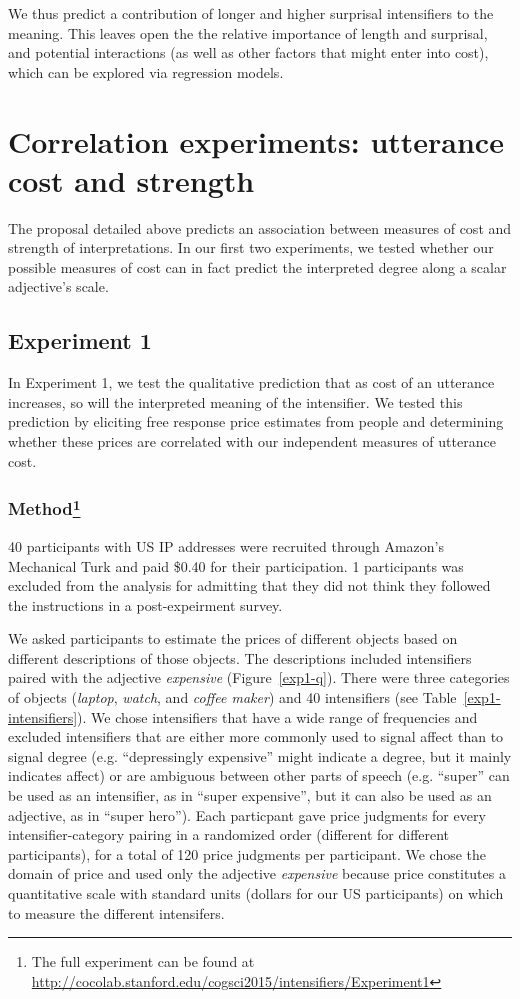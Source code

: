 \documentclass[10pt,letterpaper]{article}
\newcommand{\w}[1]{\emph{#1}}
\begin{document}
We thus predict a contribution of longer and higher surprisal intensifiers to the meaning. 
This leaves open the the relative importance of length and surprisal, and potential interactions (as well as other factors that might enter into cost), which can be explored via regression models.

\section{Correlation experiments: utterance cost and strength}
The proposal detailed above predicts an association between measures of cost and strength of interpretations. In our first two experiments, we tested whether our possible measures of cost can in fact predict the interpreted degree along a scalar adjective's scale.

\subsection{Experiment 1}

In Experiment 1, we test the qualitative prediction that as cost of an utterance increases, so will the interpreted meaning of the intensifier.
We tested this prediction
by eliciting free response price estimates from people and determining whether these prices are correlated with our independent measures of utterance cost.

\subsubsection{Method\footnote{The full experiment can be found at \url{http://cocolab.stanford.edu/cogsci2015/intensifiers/Experiment1}}}

40 participants with US IP addresses were recruited through Amazon's Mechanical Turk and paid \$0.40 for their participation. 1 participants was excluded from the analysis for admitting that they did not think they followed the instructions in a post-expeirment survey.

We asked participants to estimate the prices of different objects based on different descriptions of those objects. The descriptions included intensifiers paired with the adjective \w{expensive} (Figure~\ref{exp1-q}).
There were three categories of objects (\emph{laptop}, \emph{watch}, and \emph{coffee maker}) and 40 intensifiers (see Table~\ref{exp1-intensifiers}).
We chose intensifiers that have a wide range of frequencies and excluded intensifiers that are either more commonly used to signal affect than to signal degree (e.g. ``depressingly expensive'' might indicate a degree, but it mainly indicates affect) or are ambiguous between other parts of speech (e.g. ``super'' can be used as an intensifier, as in ``super expensive'', but it can also be used as an adjective, as in ``super hero'').
Each particpant gave price judgments for every intensifier-category pairing in a randomized order (different for different participants), for a total of 120 price judgments per participant.
We chose the domain of price and used only the adjective \w{expensive} because price constitutes a quantitative scale with standard units (dollars for our US participants) on which to measure the different intensifers.
\end{document}
